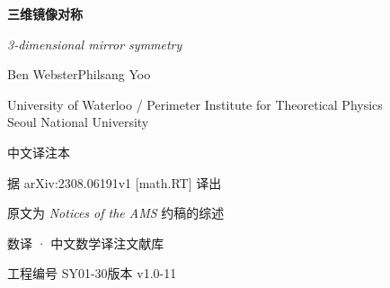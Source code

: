 \begin{titlepage}
\centering
\vspace*{2.2cm}

{\LARGE\bfseries 三维镜像对称\par}
\vspace{0.6cm}
{\large\itshape 3-dimensional mirror symmetry\par}

\vspace{1.8cm}
{\large Ben Webster\quad Philsang Yoo\par}
\vspace{0.35cm}
{\normalsize University of Waterloo / Perimeter Institute for Theoretical Physics\\
Seoul National University\par}

\vspace{2.4cm}
{\large 中文译注本\par}
\vspace{0.3cm}
{\normalsize 据 arXiv:2308.06191v1 [math.RT] 译出\par}
{\normalsize 原文为 \textit{Notices of the AMS} 约稿的综述\par}

\vfill
{\normalsize 数译 · 中文数学译注文献库\par}
{\normalsize 工程编号 SY01-30\qquad 版本 v1.0-11\par}
\end{titlepage}
